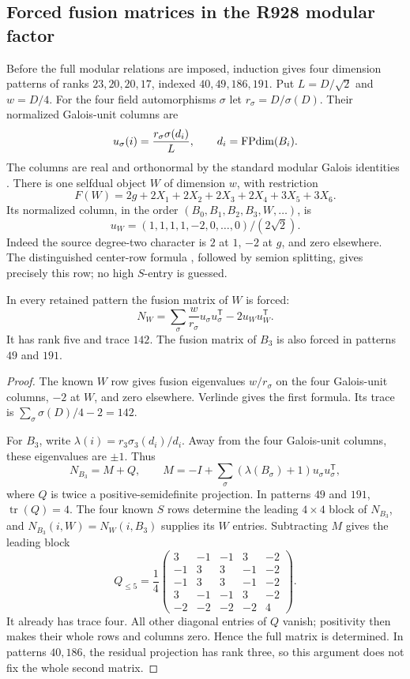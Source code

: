 \subsection{Forced fusion matrices in the R928 modular factor}
Before the full modular relations are imposed, induction gives four dimension patterns of ranks $23,20,20,17$, indexed $40,49,186,191$. Put $L=D/\sqrt2$ and $w=D/4$.
For the four field automorphisms $\sigma$ let
$r_\sigma=D/\sigma(D)$. Their normalized Galois-unit columns are
\[
 u_\sigma(i)=\frac{r_\sigma\sigma(d_i)}{L},
 \qquad d_i=\operatorname{FPdim}(B_i).
\]
The columns are real and orthonormal by the standard modular Galois
identities \cite{DLNGalois}. There is one selfdual object $W$ of
dimension $w$, with restriction
\[
 F(W)=2g+2X_1+2X_2+2X_3+2X_4+3X_5+3X_6.
\]
Its normalized column, in the order $(B_0,B_1,B_2,B_3,W,\ldots)$, is
\[
 u_W=(1,1,1,1,-2,0,\ldots,0)/(2\sqrt2).
\]
Indeed the source degree-two character is $2$ at $1$, $-2$ at $g$, and
zero elsewhere. The distinguished center-row formula
\cite{DeshpandeCenter}, followed by semion splitting, gives precisely
this row; no high $S$-entry is guessed.

\begin{proposition}
In every retained pattern the fusion matrix of $W$ is forced:
\[
 N_W=\sum_\sigma\frac{w}{r_\sigma}u_\sigma u_\sigma^{\mathsf T}
                  -2u_Wu_W^{\mathsf T}.
\]
It has rank five and trace $142$. The fusion matrix of $B_3$ is also
forced in patterns $49$ and $191$.
\end{proposition}
\begin{proof}
The known $W$ row gives fusion eigenvalues $w/r_\sigma$ on the four
Galois-unit columns, $-2$ at $W$, and zero elsewhere. Verlinde gives the
first formula. Its trace is
$\sum_\sigma\sigma(D)/4-2=142$.

For $B_3$, write
$\lambda(i)=r_3\sigma_3(d_i)/d_i$. Away from the four Galois-unit columns,
these eigenvalues are $\pm1$. Thus
\[
 N_{B_3}=M+Q,\qquad
 M=-I+\sum_\sigma(\lambda(B_\sigma)+1)
                       u_\sigma u_\sigma^{\mathsf T},
\]
where $Q$ is twice a positive-semidefinite projection. In patterns $49$
and $191$, $\operatorname{tr}(Q)=4$. The four known $S$ rows determine
the leading $4\times4$ block of $N_{B_3}$, and
$N_{B_3}(i,W)=N_W(i,B_3)$ supplies its $W$ entries. Subtracting $M$
gives the leading block
\[
 Q_{\le5}=\frac14
 \begin{pmatrix}
 3&-1&-1&3&-2\\-1&3&3&-1&-2\\-1&3&3&-1&-2\\
 3&-1&-1&3&-2\\-2&-2&-2&-2&4
 \end{pmatrix}.
\]
It already has trace four. All other diagonal entries of $Q$ vanish;
positivity then makes their whole rows and columns zero. Hence the full
matrix is determined. In patterns $40,186$, the residual projection has
rank three, so this argument does not fix the whole second matrix.
\end{proof}

